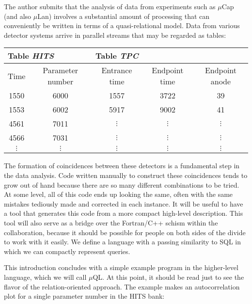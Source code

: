 \documentclass[12pt]{article}
\begin{document}
The author submits that the analysis of data from experiments such as
$\mu$Cap (and also $\mu$Lan) involves a substantial amount of processing that
can conveniently be written in terms of a quasi-relational model. 
Data from various detector systems arrive in parallel streams that may
be regarded as tables:

\vspace{5mm}
\begin{tabular}{|c|c||c|c|c|}
\multicolumn{2}{l}{Table {\em HITS}} & \multicolumn{3}{l}{Table {\em TPC}} \\
\hline
Time & Parameter number & Entrance time & Endpoint time & Endpoint anode \\
\hline
1550 & 6000 & 1557 & 3722 & 39 \\
1553 & 6002 & 5917 & 9002 & 41 \\
4561 & 7011 & $\vdots$ & $\vdots$ & $\vdots$ \\
4566 & 7031 & $\vdots$ & $\vdots$ & $\vdots$ \\
$\vdots$ & $\vdots$ & $\vdots$ & $\vdots$ & $\vdots$ \\
\hline
\end{tabular}
\vspace{5mm}

The formation of coincidences between these detectors is a fundamental 
step in the data analysis.  Code written manually to construct these 
coincidences tends to grow out of hand because there are so many different
combinations to be tried.  At some level, all of this code ends up 
looking the same, often with the same mistakes tediously made and corrected
in each instance.   It will be useful to have a tool that generates this
code from a more compact high-level description.  This tool will also serve
as a bridge over the Fortran/C++ schism within the collaboration, because it
should be possible for people on both sides of the divide to work with it
easily.  We define a language with a passing similarity to SQL
in which we can compactly represent queries.  

This introduction concludes with a simple example program in the higher-level 
language, which we will call $\mu$QL.  At this point, it should be read just
to see the flavor of the relation-oriented approach.
The example makes an autocorrelation plot for a single parameter number 
in the HITS bank:
\end{document}
